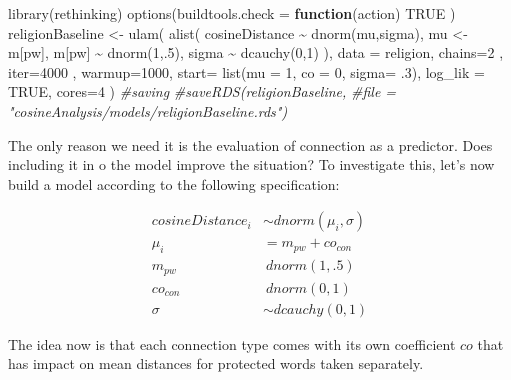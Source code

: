 \documentclass[
  12pt,
]{book}
\newenvironment{Shaded}{\begin{snugshade}}{\end{snugshade}}
\newcommand{\AttributeTok}[1]{\textcolor[rgb]{0.77,0.63,0.00}{#1}}
\newcommand{\CommentTok}[1]{\textcolor[rgb]{0.56,0.35,0.01}{\textit{#1}}}
\newcommand{\ConstantTok}[1]{\textcolor[rgb]{0.00,0.00,0.00}{#1}}
\newcommand{\ControlFlowTok}[1]{\textcolor[rgb]{0.13,0.29,0.53}{\textbf{#1}}}
\newcommand{\DecValTok}[1]{\textcolor[rgb]{0.00,0.00,0.81}{#1}}
\newcommand{\FunctionTok}[1]{\textcolor[rgb]{0.00,0.00,0.00}{#1}}
\newcommand{\NormalTok}[1]{#1}
\newcommand{\OtherTok}[1]{\textcolor[rgb]{0.56,0.35,0.01}{#1}}
\newcommand{\SpecialCharTok}[1]{\textcolor[rgb]{0.00,0.00,0.00}{#1}}
\begin{document}
\begin{Shaded}
\begin{Highlighting}[]
\FunctionTok{library}\NormalTok{(rethinking)}
\FunctionTok{options}\NormalTok{(}\AttributeTok{buildtools.check =} \ControlFlowTok{function}\NormalTok{(action) }\ConstantTok{TRUE}\NormalTok{ )}
\NormalTok{religionBaseline }\OtherTok{\textless{}{-}} \FunctionTok{ulam}\NormalTok{(}
  \FunctionTok{alist}\NormalTok{(}
\NormalTok{    cosineDistance }\SpecialCharTok{\textasciitilde{}} \FunctionTok{dnorm}\NormalTok{(mu,sigma),}
\NormalTok{    mu }\OtherTok{\textless{}{-}}\NormalTok{ m[pw],}
\NormalTok{    m[pw] }\SpecialCharTok{\textasciitilde{}} \FunctionTok{dnorm}\NormalTok{(}\DecValTok{1}\NormalTok{,.}\DecValTok{5}\NormalTok{),}
\NormalTok{    sigma }\SpecialCharTok{\textasciitilde{}} \FunctionTok{dcauchy}\NormalTok{(}\DecValTok{0}\NormalTok{,}\DecValTok{1}\NormalTok{)}
\NormalTok{  ),}
  \AttributeTok{data =}\NormalTok{ religion,}
  \AttributeTok{chains=}\DecValTok{2}\NormalTok{ , }\AttributeTok{iter=}\DecValTok{4000}\NormalTok{ , }\AttributeTok{warmup=}\DecValTok{1000}\NormalTok{,}
  \AttributeTok{start=} \FunctionTok{list}\NormalTok{(}\AttributeTok{mu =} \DecValTok{1}\NormalTok{, }\AttributeTok{co =} \DecValTok{0}\NormalTok{, }\AttributeTok{sigma=}\NormalTok{ .}\DecValTok{3}\NormalTok{),}
  \AttributeTok{log\_lik =} \ConstantTok{TRUE}\NormalTok{, }\AttributeTok{cores=}\DecValTok{4}
\NormalTok{)}
\CommentTok{\#saving}
\CommentTok{\#saveRDS(religionBaseline, }
\CommentTok{\#file = "cosineAnalysis/models/religionBaseline.rds")}
\end{Highlighting}
\end{Shaded}

The only reason we need it is the evaluation of connection as a predictor. Does including it in o the model improve the situation? To investigate this, let's now build a model according to the following specification:

\begin{align}
cosineDistance_i  & \sim dnorm(\mu_i, \sigma) \\
\mu_i & = m_{pw} + co_{con}\\
m_{pw} & ~ dnorm(1,.5) \\
co_{con} & ~ dnorm(0,1) \\
\sigma &\sim  dcauchy(0,1)
\end{align}

\noindent The idea now is that each connection type comes with its own coefficient \(co\) that has impact on mean distances for protected words taken separately.
\end{document}

